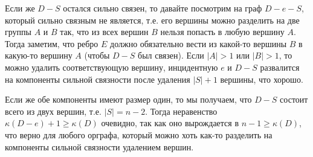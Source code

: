 	Если же $D-S$ остался сильно связен, то давайте посмотрим на граф $D-e-S$, который сильно связным не является,
	т.е. его вершины можно разделить на две группы $A$ и $B$ так, что из всех вершин $B$ нельзя попасть в любую вершину $A$.
	Тогда заметим, что ребро $E$ должно обязательно вести из какой-то вершины $B$ в какую-то вершину $A$ (чтобы $D-S$ был связен).
	Если $|A|>1$ или $|B|>1$, то можно удалить соответствующую вершину, инцидентную $e$ и $D-S$
	развалится на компоненты сильной связности после удаления $|S|+1$ вершины, что хорошо.

	Если же обе компоненты имеют размер один, то мы получаем, что $D-S$ состоит всего из двух вершин, т.е. $|S|=n-2$.
	Тогда неравенство $\kappa(D - e) + 1 \ge \kappa(D)$ очевидно, так как оно вырождается в $n-1 \ge \kappa(D)$,
	что верно для любого орграфа, который можно хоть как-то разделить на компоненты сильной связности удалением вершин.
